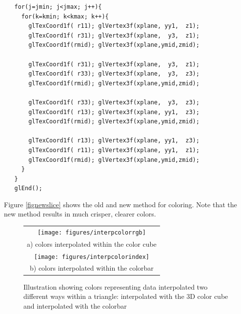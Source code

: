 \documentclass[11pt,twoside]{book}
\newcommand{\figoptions}{P}
\begin{document}
\begin{verbatim}
   for(j=jmin; j<jmax; j++){
     for(k=kmin; k<kmax; k++){
       glTexCoord1f( r11); glVertex3f(xplane, yy1,  z1);
       glTexCoord1f( r31); glVertex3f(xplane,  y3,  z1);
       glTexCoord1f(rmid); glVertex3f(xplane,ymid,zmid);

       glTexCoord1f( r31); glVertex3f(xplane,  y3,  z1);
       glTexCoord1f( r33); glVertex3f(xplane,  y3,  z3);
       glTexCoord1f(rmid); glVertex3f(xplane,ymid,zmid);

       glTexCoord1f( r33); glVertex3f(xplane,  y3,  z3);
       glTexCoord1f( r13); glVertex3f(xplane, yy1,  z3);
       glTexCoord1f(rmid); glVertex3f(xplane,ymid,zmid);

       glTexCoord1f( r13); glVertex3f(xplane, yy1,  z3);
       glTexCoord1f( r11); glVertex3f(xplane, yy1,  z1);
       glTexCoord1f(rmid); glVertex3f(xplane,ymid,zmid);
     }
   }
   glEnd();
\end{verbatim}



Figure \ref{fignewslice} shows the old and new method for coloring.  Note that the new method results in much crisper, clearer colors.



\begin{figure}[\figoptions]
\begin{center}
\begin{tabular}{c}
\texttt{[image: figures/interpcolorrgb]}\\
a) colors interpolated within the color cube\\
\texttt{[image: figures/interpcolorindex]}\\
b) colors interpolated within the colorbar\\
\end{tabular}
\end{center}
\caption[Color interpolation examples]
{Illustration showing colors representing data interpolated two different ways within a triangle: interpolated with the 3D color cube and interpolated with the colorbar}
\label{colorinterp}%
\end{figure}

%
%
\end{document}
